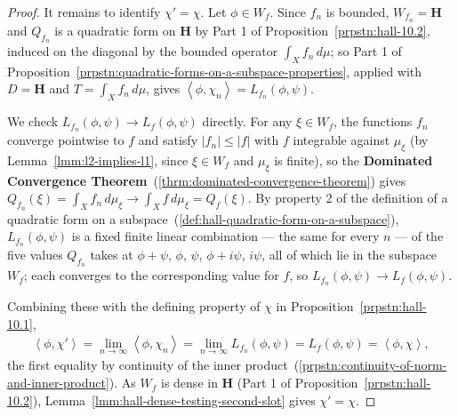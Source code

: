 \begin{proof}
It remains to identify $\chi' = \chi$. Let $\phi \in W_f$. Since $f_n$ is bounded, $W_{f_n} = \mathbf{H}$ and $Q_{f_n}$ is a quadratic form on $\mathbf{H}$ by Part 1 of Proposition~\ref{prpstn:hall-10.2}, induced on the diagonal by the bounded operator $\int_X f_n\,d\mu$; so Part 1 of Proposition~\ref{prpstn:quadratic-forms-on-a-subspace-properties}, applied with $D = \mathbf{H}$ and $T = \int_X f_n\,d\mu$, gives $\left< \phi, \chi_n \right> = L_{f_n}(\phi,\psi)$.

We check $L_{f_n}(\phi,\psi) \to L_f(\phi,\psi)$ directly. For any $\xi \in W_f$, the functions $f_n$ converge pointwise to $f$ and satisfy $\lvert f_n \rvert \le \lvert f \rvert$ with $f$ integrable against $\mu_\xi$ (by Lemma~\ref{lmm:l2-implies-l1}, since $\xi \in W_f$ and $\mu_\xi$ is finite), so the \textbf{Dominated Convergence Theorem}~(\ref{thrm:dominated-convergence-theorem}) gives $Q_{f_n}(\xi) = \int_X f_n\,d\mu_\xi \to \int_X f\,d\mu_\xi = Q_f(\xi)$. By property 2 of the definition of a quadratic form on a subspace~(\ref{def:hall-quadratic-form-on-a-subspace}), $L_{f_n}(\phi,\psi)$ is a fixed finite linear combination — the same for every $n$ — of the five values $Q_{f_n}$ takes at $\phi+\psi$, $\phi$, $\psi$, $\phi+i\psi$, $i\psi$, all of which lie in the subspace $W_f$; each converges to the corresponding value for $f$, so $L_{f_n}(\phi,\psi) \to L_f(\phi,\psi)$.

Combining these with the defining property of $\chi$ in Proposition~\ref{prpstn:hall-10.1},
\begin{align}
    \left< \phi, \chi' \right> = \lim_{n\to\infty}\left< \phi, \chi_n \right> = \lim_{n\to\infty} L_{f_n}(\phi,\psi) = L_f(\phi,\psi) = \left< \phi, \chi \right>,
\end{align}
the first equality by continuity of the inner product~(\ref{prpstn:continuity-of-norm-and-inner-product}). As $W_f$ is dense in $\mathbf{H}$ (Part 1 of Proposition~\ref{prpstn:hall-10.2}), Lemma~\ref{lmm:hall-dense-testing-second-slot} gives $\chi' = \chi$.
\end{proof}

